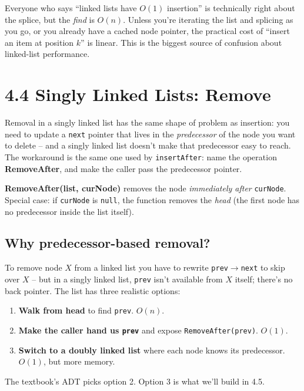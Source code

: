 \documentclass[11pt]{article}
\begin{document}
\begin{warnbox}
Everyone who says ``linked lists have $O(1)$ insertion'' is
technically right about the splice, but the \emph{find} is
$O(n)$. Unless you're iterating the list and splicing as you go, or
you already have a cached node pointer, the practical cost of
``insert an item at position $k$'' is linear. This is the biggest
source of confusion about linked-list performance.
\end{warnbox}

\section{4.4 Singly Linked Lists: Remove}

Removal in a singly linked list has the same shape of problem as
insertion: you need to update a \texttt{next} pointer that lives in
the \emph{predecessor} of the node you want to delete -- and a
singly linked list doesn't make that predecessor easy to reach. The
workaround is the same one used by \texttt{insertAfter}: name the
operation \textbf{RemoveAfter}, and make the caller pass the
predecessor pointer.

\begin{defnbox}[RemoveAfter]
\textbf{RemoveAfter(list, curNode)} removes the node
\emph{immediately after} \texttt{curNode}. Special case: if
\texttt{curNode} is \texttt{null}, the function removes the
\emph{head} (the first node has no predecessor inside the list
itself).
\end{defnbox}

\subsection{Why predecessor-based removal?}

\begin{ideabox}
To remove node $X$ from a linked list you have to rewrite
\texttt{prev$\to$next} to skip over $X$ -- but in a singly linked
list, \texttt{prev} isn't available from $X$ itself; there's no back
pointer. The list has three realistic options:
\begin{enumerate}[leftmargin=*]
  \item \textbf{Walk from head} to find \texttt{prev}. $O(n)$.
  \item \textbf{Make the caller hand us \texttt{prev}} and expose
        \texttt{RemoveAfter(prev)}. $O(1)$.
  \item \textbf{Switch to a doubly linked list} where each node
        knows its predecessor. $O(1)$, but more memory.
\end{enumerate}
The textbook's ADT picks option 2. Option 3 is what we'll build in
4.5.
\end{ideabox}
\end{document}
